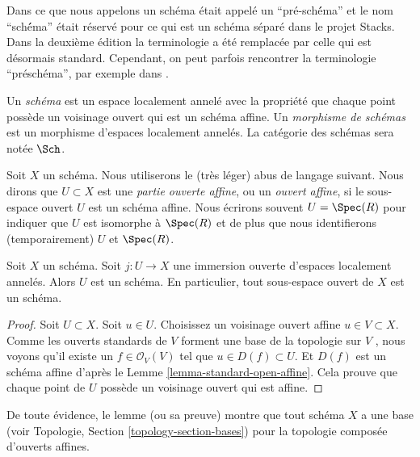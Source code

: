 \begin{definition}
\label{definition-scheme}
\begin{history}
Dans  \cite{EGA1}  ce que nous appelons un schéma était appelé un
``pré-sch\'éma'' et le nom ``sch\'éma'' était réservé pour ce
qui est un schéma séparé dans le projet Stacks. Dans la deuxième édition
 \cite{EGA1-second}  la terminologie a été remplacée par celle qui est désormais
standard. Cependant, on peut parfois rencontrer la terminologie ``préschéma'', par
exemple dans  \cite{Murre-lectures}.
\end{history}
Un  {\it  schéma}  est un espace localement annelé
avec la propriété que chaque point possède un voisinage ouvert qui est un schéma
affine. Un  {\it  morphisme de schémas}  est un
morphisme d'espaces localement annelés. La catégorie des schémas sera notée
 $\Sch$.
\end{definition}

\noindent
Soit $X$ un schéma. Nous utiliserons le (très léger) abus de langage
suivant. Nous dirons que $U \subset X$  est une  {\it partie ouverte
affine}, ou un  {\it ouvert affine}, si le
sous-espace ouvert $U$  est un schéma affine. Nous écrirons souvent
 $U = \Spec(R)$ pour indiquer que $U$  est isomorphe à  $\Spec(R)$ et de plus
que nous identifierons (temporairement) $U$  et  $\Spec(R)$.

\begin{lemma}
\label{lemma-open-subspace-scheme}
Soit  $X$  un schéma. Soit  $j : U \to X$  une immersion ouverte d'espaces
localement annelés. Alors  $U$  est un schéma. En particulier, tout
sous-espace ouvert de  $X$  est un schéma.
\end{lemma}

\begin{proof}
Soit  $U \subset X$. Soit  $u \in U$. Choisissez un voisinage ouvert affine
 $u \in V \subset X$. Comme les ouverts standards de  $V$  forment une base de la
topologie sur  $V$ , nous voyons qu'il existe un  $f\in \mathcal{O}_V(V)$  tel que
 $u \in D(f) \subset U$. Et  $D(f)$  est un schéma affine d'après le Lemme  \ref{lemma-standard-open-affine}.
Cela prouve que chaque point de  $U$  possède un voisinage ouvert qui est
affine.
\end{proof}

\noindent
De toute évidence, le lemme (ou sa preuve) montre que tout schéma  $X$  a
une base (voir Topologie, Section  \ref{topology-section-bases}) pour la topologie composée
d'ouverts affines.

